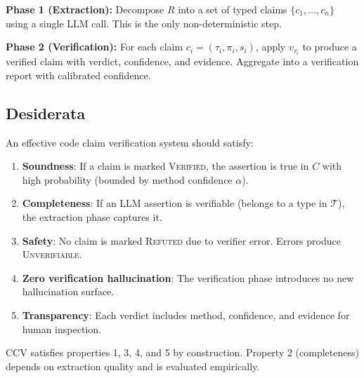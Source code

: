 \textbf{Phase 1 (Extraction):} Decompose $R$ into a set of typed claims $\{c_1, \ldots, c_n\}$ using a single LLM call. This is the only non-deterministic step.

\textbf{Phase 2 (Verification):} For each claim $c_i = (\tau_i, \pi_i, s_i)$, apply $v_{\tau_i}$ to produce a verified claim with verdict, confidence, and evidence. Aggregate into a verification report with calibrated confidence.

\subsection{Desiderata}

An effective code claim verification system should satisfy:

\begin{enumerate}
    \item \textbf{Soundness}: If a claim is marked \textsc{Verified}, the assertion is true in $C$ with high probability (bounded by method confidence $\alpha$).
    \item \textbf{Completeness}: If an LLM assertion is verifiable (belongs to a type in $\mathcal{T}$), the extraction phase captures it.
    \item \textbf{Safety}: No claim is marked \textsc{Refuted} due to verifier error. Errors produce \textsc{Unverifiable}.
    \item \textbf{Zero verification hallucination}: The verification phase introduces no new hallucination surface.
    \item \textbf{Transparency}: Each verdict includes method, confidence, and evidence for human inspection.
\end{enumerate}

CCV satisfies properties 1, 3, 4, and 5 by construction. Property 2 (completeness) depends on extraction quality and is evaluated empirically.
